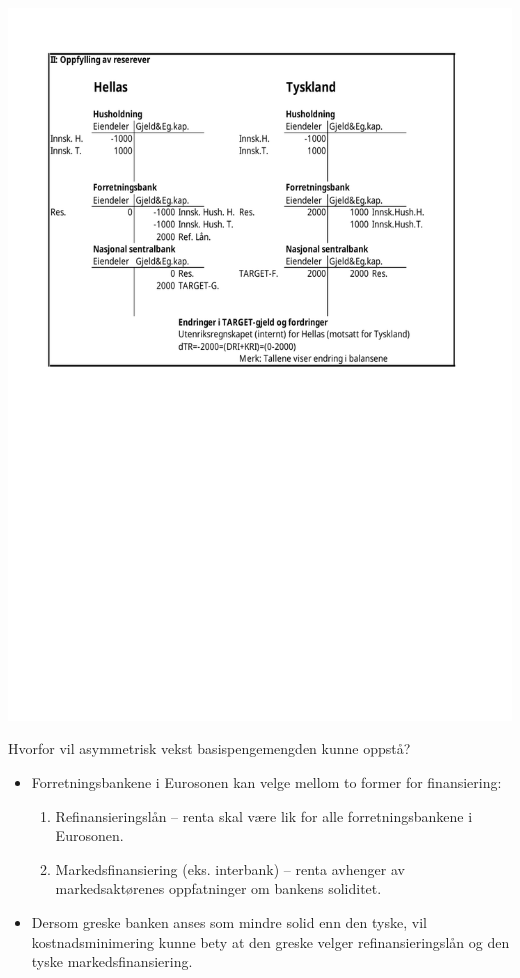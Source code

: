 \documentclass[notes=show notes]{beamer}
\begin{document}
\begin{frame}
\centering
\includegraphics[width=0.8\linewidth]{Fork2_delII}
\end{frame}
\begin{frame}{Hvorfor vil asymmetrisk vekst basispengemengden kunne oppst\aa ?}
\begin{itemize}
\item Forretningsbankene i Eurosonen kan velge mellom to former for finansiering:
\begin{enumerate}
\item Refinansieringsl\aa n -- renta skal v\ae re lik for alle forretningsbankene i Eurosonen.
\item Markedsfinansiering (eks. interbank) --  renta avhenger av markedsakt\o renes oppfatninger om bankens soliditet.
\end{enumerate}
\item Dersom greske banken anses som mindre solid enn den tyske, vil kostnadsminimering kunne bety at den greske velger refinansieringsl\aa n og den tyske markedsfinansiering.
\end{itemize}
\end{frame}
\end{document}
